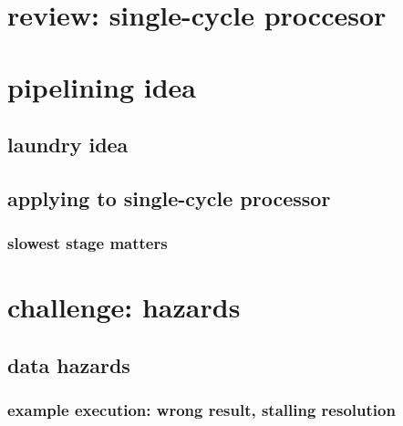 \date{}
\title{}
\date{}
\usepackage{pgfplots}
\pgfplotsset{compat=1.16}

\begin{frame}
    \titlepage
\end{frame}


\usetikzlibrary{circuits.logic.mux}

\section{review: single-cycle proccesor}







\section{pipelining idea}

\subsection{laundry idea}



\subsection{applying to single-cycle processor}


\subsubsection{slowest stage matters}




\section{challenge: hazards}

\subsection{data hazards}

\subsubsection{example execution: wrong result, stalling resolution}


